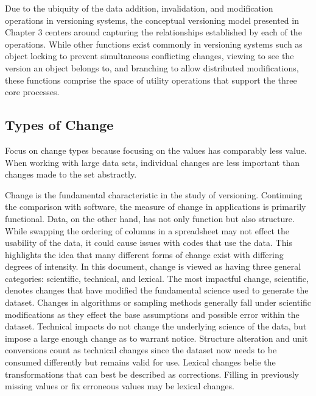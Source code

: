 Due to the ubiquity of the data addition, invalidation, and modification operations in versioning systems, the conceptual versioning model presented in Chapter 3 centers around capturing the relationships established by each of the operations.
While other functions exist commonly in versioning systems such as object locking to prevent simultaneous conflicting changes, viewing to see the version an object belongs to, and branching to allow distributed modifications, these functions comprise the space of utility operations that support the three core processes.

\subsection{Types of Change}

Focus on change types because focusing on the values has comparably less value.
When working with large data sets, individual changes are less important than changes made to the set abstractly.

Change is the fundamental characteristic in the study of versioning.
Continuing the comparison with software, the measure of change in applications is primarily functional.
Data, on the other hand, has not only function but also structure.
While swapping the ordering of columns in a spreadsheet may not effect the usability of the data, it could cause issues with codes that use the data.
This highlights the idea that many different forms of change exist with differing degrees of intensity.
In this document, change is viewed as having three general categories: scientific, technical, and lexical.
The most impactful change, scientific, denotes changes that have modified the fundamental science used to generate the dataset.
Changes in algorithms or sampling methods generally fall under scientific modifications as they effect the base assumptions and possible error within the dataset.
Technical impacts do not change the underlying science of the data, but impose a large enough change as to warrant notice.
Structure alteration and unit conversions count as technical changes since the dataset now needs to be consumed differently but remains valid for use.
Lexical changes belie the transformations that can best be described as corrections.
Filling in previously missing values or fix erroneous values may be lexical changes.

